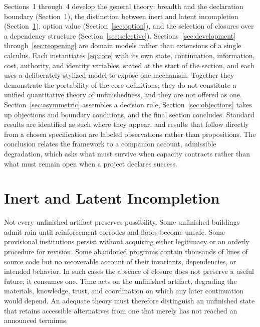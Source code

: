 Sections~1 through~4 develop the general theory: breadth and the declaration boundary (Section~1), the distinction between inert and latent incompletion (Section~\ref{sec:inert}), option value (Section~\ref{sec:option}), and the selection of closures over a dependency structure (Section~\ref{sec:selective}). Sections~\ref{sec:development} through~\ref{sec:reopening} are domain models rather than extensions of a single calculus. Each instantiates \eqref{eq:core} with its own state, continuation, information, cost, authority, and identity variables, stated at the start of the section, and each uses a deliberately stylized model to expose one mechanism. Together they demonstrate the portability of the core definitions; they do not constitute a unified quantitative theory of unfinishedness, and they are not offered as one. Section~\ref{sec:asymmetric} assembles a decision rule, Section~\ref{sec:objections} takes up objections and boundary conditions, and the final section concludes. Standard results are identified as such where they appear, and results that follow directly from a chosen specification are labeled observations rather than propositions. The conclusion relates the framework to a companion account, admissible degradation, which asks what must survive when capacity contracts rather than what must remain open when a project declares success.

\section{Inert and Latent Incompletion}\label{sec:inert}

Not every unfinished artifact preserves possibility. Some unfinished buildings admit rain until reinforcement corrodes and floors become unsafe. Some provisional institutions persist without acquiring either legitimacy or an orderly procedure for revision. Some abandoned programs contain thousands of lines of source code but no recoverable account of their invariants, dependencies, or intended behavior. In such cases the absence of closure does not preserve a useful future; it consumes one. Time acts on the unfinished artifact, degrading the materials, knowledge, trust, and coordination on which any later continuation would depend. An adequate theory must therefore distinguish an unfinished state that retains accessible alternatives from one that merely has not reached an announced terminus.

